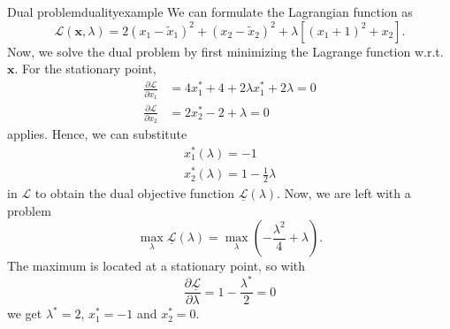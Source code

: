 \begin{example}{Dual problem}{dualityexample}
    We can formulate the Lagrangian function as
    \begin{equation}
        \mathcal{L}(\mathbf{x}, \lambda) = 2 (x_1-\tilde{x}_1)^2 + (x_2-\tilde{x}_2)^2 + \lambda \left[(x_1+1)^2 + x_2 \right].
    \end{equation}
    Now, we solve the dual problem by first minimizing the Lagrange function w.r.t. $\mathbf{x}$. For the stationary point, 
    \begin{align}
        \frac{\partial \mathcal{L}}{\partial x_1} &= 4 x^*_1 +4 + 2 \lambda x^*_1 + 2 \lambda = 0\\
        \frac{\partial \mathcal{L}}{\partial x_2} &= 2 x^*_2 - 2 + \lambda = 0
    \end{align} 
    applies. Hence, we can substitute 
    \begin{align}
        x^*_1(\lambda) = -1 \\
        x^*_2(\lambda) = 1 - \frac{1}{2} \lambda 
    \end{align}
    in $\mathcal{L}$ to obtain the dual objective function $\underline{\mathcal{L}} (\lambda)$. Now, we are left with a problem 
    \begin{equation}
        \max_{\lambda} \underline{\mathcal{L}} (\lambda) = 
        \max_{\lambda} \left( - \frac{\lambda^2}{4} + \lambda \right).
    \end{equation}
    The maximum is located at a stationary point, so with 
    \begin{equation}
        \frac{\partial \underline{\mathcal{L}} }{\partial \lambda} = 1 - \frac{\lambda^*}{2}  = 0
    \end{equation}
    we get $\lambda^*=2$, $x_1^*=-1$ and $x_2^*=0$.
\end{example}

